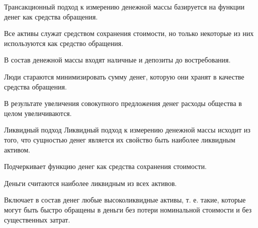 \documentclass[_DKB_p1_Money.tex]{subfiles}
\begin{document}
\begin{frame}
\begin{block}{Трансакционный подход }
к измерению денежной массы базируется на функции денег как средства обращения. 

Все активы служат средством сохранения стоимости, но только некоторые из них используются как средство обращения.

В состав денежной массы входят наличные и депозиты до востребования.

Люди стараются минимизировать сумму денег, которую они хранят в качестве средства обращения.

В результате увеличения совокупного предложения денег расходы общества в целом увеличиваются.
\end{block}
\end{frame}

\begin{frame}
\begin{block}{Ликвидный подход}
Ликвидный подход к измерению денежной массы исходит из того, что сущностью денег является их свойство быть наиболее ликвидным активом.

Подчеркивает функцию денег как средства сохранения стоимости.

Деньги считаются наиболее ликвидным из всех активов.

Включает в состав денег любые высоколиквидные активы, т. е. такие, которые могут быть быстро обращены в деньги без потери номинальной стоимости и без существенных затрат.
\end{block}
\end{frame}
\end{document}
